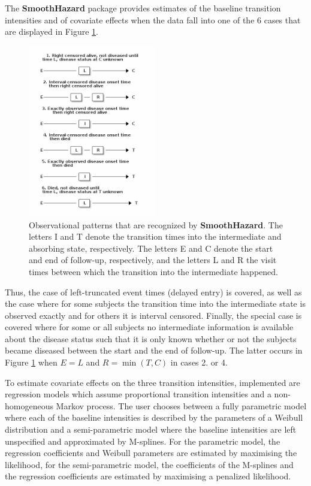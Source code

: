 \documentclass{article}
\newcommand{\pkg}[1]{{\bf #1}}
\begin{document}
The \pkg{SmoothHazard} package provides estimates of the baseline transition
intensities and of covariate effects when the data fall into one of
the 6 cases that are displayed in Figure \ref{fig:0}.
\begin{figure}[htb]
\centering
\includegraphics[width=0.5\textwidth]{obs-patterns.png}
\caption{\label{fig:0}Observational patterns that are recognized by \pkg{SmoothHazard}. The letters I and T denote the transition times into the intermediate and absorbing state, respectively. The letters E and C denote the start and end of follow-up, respectively, and the letters L and R the visit times between which the transition into the intermediate happened.}
\end{figure}
Thus, the case of left-truncated event times
(delayed entry) is covered, as well as the case where for some
subjects the transition time into the intermediate state is observed
exactly and for others it is interval censored.  Finally, the special
case is covered where for some or all subjects no intermediate
information is available about the disease status such that it is only
known whether or not the subjects became diseased between the start
and the end of follow-up. The latter occurs in Figure \ref{fig:0} when
$E=L$ and $R=\min(T,C)$ in cases 2. or 4.

To estimate covariate effects on the three transition intensities,
implemented are regression models which assume proportional transition
intensities and a non-homogeneous Markov process. The user chooses
between a fully parametric model where each of the baseline
intensities is described by the parameters of a Weibull distribution
and a semi-parametric model where the baseline intensities are left
unspecified and approximated by M-splines. For the parametric model,
the regression coefficients and Weibull parameters are estimated by
maximising the likelihood, for the semi-parametric model, the
coefficients of the M-splines and the regression coefficients are
estimated by maximising a penalized likelihood.
\end{document}
